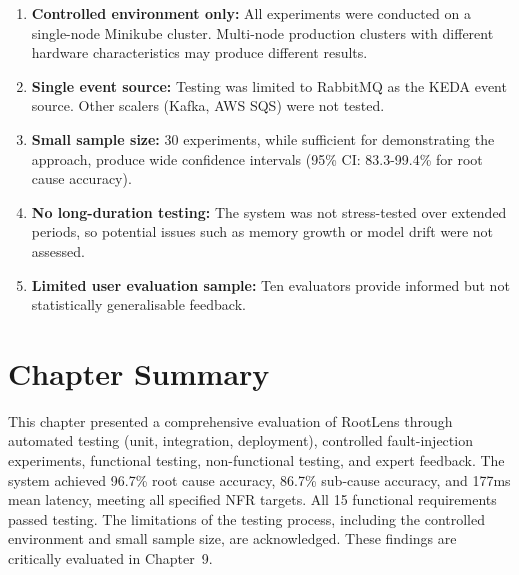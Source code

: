 \begin{enumerate}
    \item \textbf{Controlled environment only:} All experiments were conducted on a single-node Minikube cluster. Multi-node production clusters with different hardware characteristics may produce different results.
    \item \textbf{Single event source:} Testing was limited to RabbitMQ as the KEDA event source. Other scalers (Kafka, AWS SQS) were not tested.
    \item \textbf{Small sample size:} 30 experiments, while sufficient for demonstrating the approach, produce wide confidence intervals (95\% CI: 83.3-99.4\% for root cause accuracy).
    \item \textbf{No long-duration testing:} The system was not stress-tested over extended periods, so potential issues such as memory growth or model drift were not assessed.
    \item \textbf{Limited user evaluation sample:} Ten evaluators provide informed but not statistically generalisable feedback.
\end{enumerate}

\section{Chapter Summary}
This chapter presented a comprehensive evaluation of RootLens through automated testing (unit, integration, deployment), controlled fault-injection experiments, functional testing, non-functional testing, and expert feedback. The system achieved 96.7\% root cause accuracy, 86.7\% sub-cause accuracy, and 177ms mean latency, meeting all specified NFR targets. All 15 functional requirements passed testing. The limitations of the testing process, including the controlled environment and small sample size, are acknowledged. These findings are critically evaluated in Chapter~9.